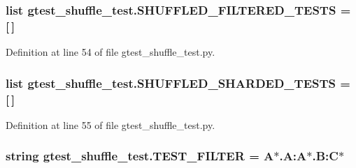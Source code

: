 \subsubsection[{\texorpdfstring{S\+H\+U\+F\+F\+L\+E\+D\+\_\+\+F\+I\+L\+T\+E\+R\+E\+D\+\_\+\+T\+E\+S\+TS}{SHUFFLED_FILTERED_TESTS}}]{\setlength{\rightskip}{0pt plus 5cm}list gtest\+\_\+shuffle\+\_\+test.\+S\+H\+U\+F\+F\+L\+E\+D\+\_\+\+F\+I\+L\+T\+E\+R\+E\+D\+\_\+\+T\+E\+S\+TS = \mbox{[}$\,$\mbox{]}}\hypertarget{namespacegtest__shuffle__test_aa9502dcb42a1d690d17558cc71388e45}{}\label{namespacegtest__shuffle__test_aa9502dcb42a1d690d17558cc71388e45}


Definition at line 54 of file gtest\+\_\+shuffle\+\_\+test.\+py.

\subsubsection[{\texorpdfstring{S\+H\+U\+F\+F\+L\+E\+D\+\_\+\+S\+H\+A\+R\+D\+E\+D\+\_\+\+T\+E\+S\+TS}{SHUFFLED_SHARDED_TESTS}}]{\setlength{\rightskip}{0pt plus 5cm}list gtest\+\_\+shuffle\+\_\+test.\+S\+H\+U\+F\+F\+L\+E\+D\+\_\+\+S\+H\+A\+R\+D\+E\+D\+\_\+\+T\+E\+S\+TS = \mbox{[}$\,$\mbox{]}}\hypertarget{namespacegtest__shuffle__test_a3603885677e36438fd2d7521db51bcb4}{}\label{namespacegtest__shuffle__test_a3603885677e36438fd2d7521db51bcb4}


Definition at line 55 of file gtest\+\_\+shuffle\+\_\+test.\+py.

\subsubsection[{\texorpdfstring{T\+E\+S\+T\+\_\+\+F\+I\+L\+T\+ER}{TEST_FILTER}}]{\setlength{\rightskip}{0pt plus 5cm}string gtest\+\_\+shuffle\+\_\+test.\+T\+E\+S\+T\+\_\+\+F\+I\+L\+T\+ER = \textquotesingle{}A$\ast$.A\+:A$\ast$.B\+:C$\ast$\textquotesingle{}}\hypertarget{namespacegtest__shuffle__test_ac2a2a6c7c009be4f94bc9c8bc0c51bb5}{}\label{namespacegtest__shuffle__test_ac2a2a6c7c009be4f94bc9c8bc0c51bb5}


